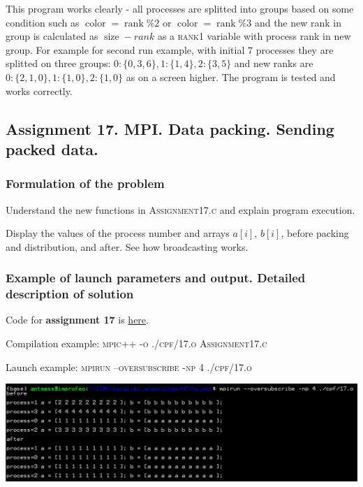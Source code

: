 \documentclass[%
12pt, %
final, %
oneside, %
onecolumn, %
centertags]{article} %
\theoremstyle{plain}
\theoremstyle{definition}
\theoremstyle{remark}
\begin{document}
This program works clearly - all processes are splitted into groups based on some condition such as $\operatorname{color}=\operatorname{rank} \% 2$ or $\operatorname{color}=\operatorname{rank} \% 3$ and the new rank in group is calculated as $\operatorname{size} - rank$ as a \textsc{rank1} variable with process rank in new group. For example for second run example, with initial $7$ processes they are splitted on three groups: $0: \{0, 3, 6\}, 1: \{1, 4\}, 2: \{3, 5\}$ and new ranks are $0: \{2, 1, 0\}, 1: \{1, 0\}, 2: \{1, 0\}$ as on a screen higher. The program is tested and works correctly.

\newpage
\subsection{Assignment 17. MPI. Data packing. Sending packed data.}

\subsubsection{Formulation of the problem}

Understand the new functions in \textsc{Assignment17.c} and explain program execution.

Display the values of the process number and arrays $a[i]$, $b[i]$, before packing and 
distribution, and after. See how broadcasting works.

\subsubsection{Example of launch parameters and output. Detailed description of solution}

Code for \textbf{assignment 17} is \href{https:\//github.com/aptmess/parallel_algorithms/blob/master/HT/hw_mpi/Assignment17.c}{here}.

Compilation example: \textsc{mpic++ -o ./cpf/17.o Assignment17.c}

Launch example: \textsc{mpirun --oversubscribe -np 4 ./cpf/17.o}

\begin{center}
\includegraphics[scale=0.55]{17.png}
\end{center}
\end{document}
